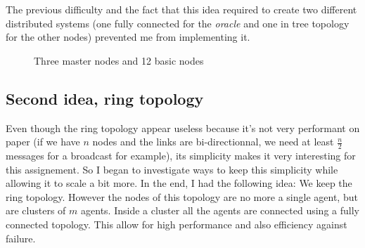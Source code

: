 \documentclass[a4paper]{article}
\begin{document}
The previous difficulty and the fact that this idea required to create two different distributed systems (one fully connected for the \textit{oracle} and one in tree topology for the other nodes) prevented me from implementing it.



\begin{figure}[H]
    \centering
\caption{Three master nodes and  12 basic nodes}
\end{figure}


\subsection{Second idea, ring topology}

Even though the ring topology appear useless because it's not very performant on paper (if we have $n$ nodes and the links are bi-directionnal, we need at least $\frac{n}{2}$ messages for a broadcast for example), its simplicity makes it very interesting for this assignement. So I began to investigate ways to keep this simplicity while allowing it to scale a bit more.
In the end, I had the following idea:
We keep the ring topology. However the nodes of this topology are no more a single agent, but are clusters of $m$ agents.
Inside a cluster all the agents are connected using a fully connected topology. This allow for high performance and also efficiency against failure.
\end{document}
